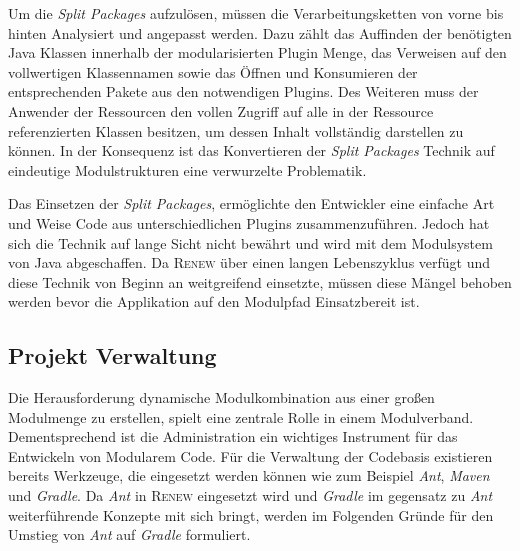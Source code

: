 		Um die \textit{Split Packages} aufzulösen, müssen die Verarbeitungsketten von vorne bis hinten Analysiert und angepasst werden. Dazu zählt das Auffinden der benötigten Java Klassen innerhalb der modularisierten Plugin Menge, das Verweisen auf den vollwertigen Klassennamen sowie das Öffnen und Konsumieren der entsprechenden Pakete aus den notwendigen Plugins. Des Weiteren muss der Anwender der Ressourcen den vollen Zugriff auf alle in der Ressource referenzierten Klassen besitzen, um dessen Inhalt vollständig darstellen zu können. In der Konsequenz ist das Konvertieren der \textit{Split Packages} Technik auf eindeutige Modulstrukturen eine verwurzelte Problematik. \bigbreak

		Das Einsetzen der \textit{Split Packages}, ermöglichte den Entwickler eine einfache Art und Weise Code aus unterschiedlichen Plugins zusammenzuführen. Jedoch hat sich die Technik auf lange Sicht nicht bewährt und wird mit dem Modulsystem von Java abgeschaffen. Da \textsc{Renew} über einen langen Lebenszyklus verfügt und diese Technik von Beginn an weitgreifend einsetzte, müssen diese Mängel behoben werden bevor die Applikation auf den Modulpfad Einsatzbereit ist. 

	\subsection{Projekt Verwaltung} \label{sub:projekt_verwaltung} %
		Die Herausforderung dynamische Modulkombination aus einer großen Modulmenge zu erstellen, spielt eine zentrale Rolle in einem Modulverband. Dementsprechend ist die Administration ein wichtiges Instrument für das Entwickeln von Modularem Code.\newline
		Für die Verwaltung der Codebasis existieren bereits Werkzeuge, die eingesetzt werden können wie zum Beispiel \textit{Ant}, \textit{Maven} und \textit{Gradle}. Da \textit{Ant} in \textsc{Renew} eingesetzt wird und \textit{Gradle} im gegensatz zu \textit{Ant} weiterführende Konzepte mit sich bringt, werden im Folgenden Gründe für den Umstieg von \textit{Ant} auf \textit{Gradle} formuliert.
	
